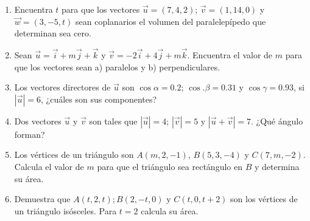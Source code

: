 \begin{enumerate}


\item Encuentra $t$ para que los vectores $\vec u=(7,4,2)$; $\vec v=(1,14,0)$ y $\vec w=(3,-5,t)$ sean coplanarios \textcolor{gris}{el volumen del paralelepípedo que determinan sea cero}.

\vspace{2mm}

\item Sean $\vec u=\vec i+m\vec j+\vec k$ y $\vec v=-2\vec i+4\vec j+m\vec k$. Encuentra el valor de $m$ para que los vectores sean a) paralelos y b) perpendiculares.

\vspace{2mm}

\item Los vectores directores de $\vec u$ son $\cos \alpha=0.2$; $\cos. \beta=0.31$ y $\cos \gamma=0.93$, si $|\vec u|=6$, ¿cuáles son sus componentes?

\vspace{2mm}

\item Dos vectores $\vec u$ y $\vec v$ son tales que $|\vec u|=4$; $|\vec v|=5$ y $|\vec u + \vec v|=7$. ¿Qué ángulo forman?

\vspace{2mm}

\item Los vértices de un triángulo son $A(m,2,-1)$, $B(5,3,-4)$ y $C(7,m,-2)$. Calcula el valor de $m$ para que el triángulo sea rectángulo en $B$ y determina su área.

\vspace{2mm}

\item Demuestra que $A(t,2,t); B(2,-t,0) \text{ y } C(t,0,t+2)$ son los vértices de un triángulo isósceles. Para $t=2$ calcula su área.


\end{enumerate}
